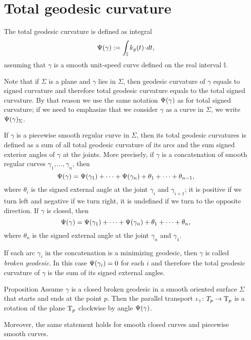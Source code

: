 \section{Total geodesic curvature}

The total geodesic curvature is defined as integral 
\[\tgc\gamma
\df
\int_{\mathbb{I}} k_g(t)\cdot dt,\]
assuming that $\gamma$ is a smooth unit-speed curve defined on the real interval $\mathbb{I}$.

Note that if $\Sigma$ is a plane and $\gamma$ lies in $\Sigma$, then geodesic curvature of $\gamma$ equals to signed curvature and therefore total geodesic curvature equals to the total signed curvature.
By that reason we use the same notation $\Psi({\gamma})$ as for total signed curvature; if we need to emphasize that we consider $\gamma$ as a curve in $\Sigma$, we write $\Psi({\gamma})_\Sigma$.

If $\gamma$ is a piecewise smooth regular curve in $\Sigma$, then
its total geodesic curvatures is defined as a sum of all total geodesic curvature of its arcs and the sum signed exterior angles of $\gamma$ at the joints.
More precisely, if $\gamma$ is a concatenation of smooth regular curves $\gamma_1,\dots,\gamma_n$, then
\[\Psi({\gamma})=\Psi({\gamma_1})+\dots+\Psi({\gamma_n})+\theta_1+\dots+\theta_{n-1},\]
where $\theta_i$ is the signed external angle at the joint $\gamma_i$ and $\gamma_{i+1}$; it is positive if we turn left and negative if we turn right, it is undefined if we turn to the opposite direction.
If $\gamma$ is closed, then 
\[\Psi({\gamma})=\Psi({\gamma_1})+\dots+\Psi({\gamma_n})+\theta_1+\dots+\theta_{n},\]
where $\theta_n$ is the signed external angle at the joint $\gamma_n$ and $\gamma_1$.

If each arc $\gamma_i$ in the concatenation is a minimizing geodesic, then $\gamma$ is called \emph{broken geodesic}.
In this case $\Psi({\gamma_i})=0$ for each $i$ and therefore the total geodesic curvature of $\gamma$ is the sum of its signed external angles.

\begin{thm}{Proposition}\label{prop:pt+tgc}
Assume $\gamma$ is a closed broken geodesic in a smooth oriented surface $\Sigma$ that starts and ends at the point $p$.
Then the parallel transport $\iota_\gamma\colon T_p\to\mathrm{T}_p$ is a rotation of the plane $\mathrm{T}_p$ clockwise by angle $\Psi({\gamma})$.

Moreover, the same statement holds for smooth closed curves and piecewise smooth curves.
\end{thm}

